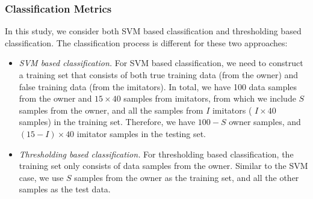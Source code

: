 \subsubsection{Classification Metrics}
In this study, we consider both SVM based classification and thresholding based classification. The classification process is different for these two approaches:

\begin{itemize}
\item \emph{SVM based classification.} For SVM based classification, we need to construct a training set that consists of both true training data (from the owner) and false training data (from the imitators). In total, we have 100 data samples from the owner and $15 \times 40$ samples from imitators, from which we include $S$ samples from the owner, and all the samples from $I$ imitators ( $I \times 40$ samples) in the training set. Therefore, we have $100-S$ owner samples, and $(15-I)\times 40$ imitator samples in the testing set.


\item \emph{Thresholding based classification.} For thresholding based classification, the training set only consists of data samples from the owner. Similar to the SVM case, we use $S$ samples from the owner as the training set, and all the other samples as the test data.
\end{itemize}


